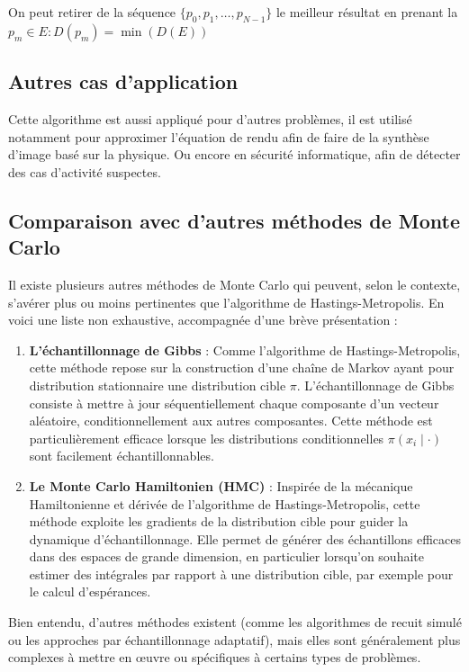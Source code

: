 \documentclass{article}
\begin{document}
On peut retirer de la séquence $\{p_0,p_1, \ldots ,p_{N-1}\}$ le meilleur résultat en prenant la $p_{m} \in E : D(p_{m}) = \min(D(E))$ 

\subsection{Autres cas d'application}

Cette algorithme est aussi appliqué pour d'autres problèmes,
il est utilisé notamment pour approximer l'équation de rendu afin de faire de la synthèse d'image basé sur la physique.
Ou encore en sécurité informatique, afin de détecter des cas d'activité suspectes.

\subsection{Comparaison avec d'autres méthodes de Monte Carlo}

Il existe plusieurs autres méthodes de Monte Carlo qui peuvent, selon le contexte, s’avérer plus ou moins pertinentes que l’algorithme de Hastings-Metropolis. En voici une liste non exhaustive, accompagnée d’une brève présentation :

\begin{enumerate}
\item \textbf{L'échantillonnage de Gibbs} : Comme l’algorithme de Hastings-Metropolis, 
cette méthode repose sur la construction d’une chaîne de Markov ayant pour distribution stationnaire une distribution cible $\pi$. 
L’échantillonnage de Gibbs consiste à mettre à jour séquentiellement chaque composante d’un vecteur aléatoire, conditionnellement aux autres composantes. 
Cette méthode est particulièrement efficace lorsque les distributions conditionnelles $\pi(x_i \mid \cdot)$ sont facilement échantillonnables.

\item \textbf{Le Monte Carlo Hamiltonien (HMC)} : Inspirée de la mécanique Hamiltonienne et dérivée de l’algorithme de Hastings-Metropolis, cette méthode exploite les gradients de la distribution cible pour guider la dynamique d’échantillonnage. Elle permet de générer des échantillons efficaces dans des espaces de grande dimension, en particulier lorsqu’on souhaite estimer des intégrales par rapport à une distribution cible, par exemple pour le calcul d’espérances.
\end{enumerate}

Bien entendu, d’autres méthodes existent (comme les algorithmes de recuit simulé ou les approches par échantillonnage adaptatif), 
mais elles sont généralement plus complexes à mettre en œuvre ou spécifiques à certains types de problèmes.
\end{document}
